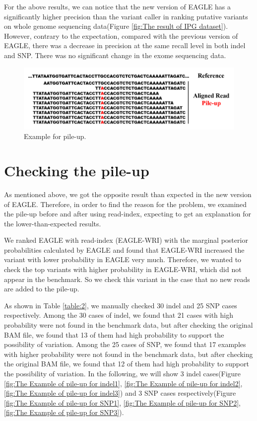\documentclass[PhD]{PHlab-thesis}
\begin{document}
For the above results, we can notice that the new version of EAGLE has a significantly higher precision than the variant caller in ranking putative variants on whole genome sequencing data(Figure \ref{fig:The result of IPG dataset}). However, contrary to the expectation, compared with the previous version of EAGLE, there was a decrease in precision at the same recall level in both indel and SNP.  There was no significant change in the exome sequencing data.

\begin{figure}[h!]
	\centering
	\includegraphics[scale=0.3]{figures/Pileup.png}
	\caption{Example for pile-up.}
	\label{fig:Example for pile-up} %
\end{figure}

\section{Checking the pile-up}
As mentioned above, we got the opposite result than expected in the new version of EAGLE.  Therefore, in order to find the reason for the problem, we examined the pile-up before and after using read-index, expecting to get an explanation for the lower-than-expected results.

We ranked EAGLE with read-index (EAGLE-WRI) with the marginal posterior probabilities calculated by EAGLE and found that EAGLE-WRI increased the variant with lower probability in EAGLE very much. Therefore, we wanted to check the top variants with higher probability in EAGLE-WRI, which did not appear in the benchmark. So we check this variant in the case that no new reads are added to the pile-up.

As shown in Table \ref{table:2}, we manually checked 30 indel and 25 SNP cases respectively. Among the 30 cases of indel, we found that 21 cases with high probability were not found in the benchmark data, but after checking the original BAM file, we found that 13 of them had high probability to support the possibility of variation. Among the 25 cases of SNP, we found that 17 examples with higher probability were not found in the benchmark data, but after checking the original BAM file, we found that 12 of them had high probability to support the possibility of variation. In the following, we will show 3 indel cases(Figure \ref{fig:The Example of pile-up for indel1}, \ref{fig:The Example of pile-up for indel2}, \ref{fig:The Example of pile-up for indel3}) and 3 SNP cases respectively(Figure \ref{fig:The Example of pile-up for SNP1}, \ref{fig:The Example of pile-up for SNP2}, \ref{fig:The Example of pile-up for SNP3}).
\end{document}
